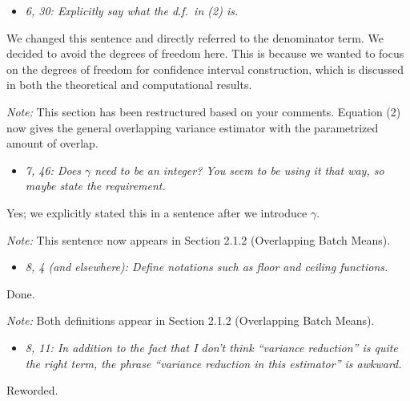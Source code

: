 \documentclass[11pt,notitlepage,onecolumn]{article}
\newcommand{\noi}{\noindent}
\begin{document}
\begin{itemize}
\item[] \textit{6, 30: Explicitly say what the d.f.\ in (2) is.}
\end{itemize}

\noi
We changed this sentence and directly referred to the denominator term.
We decided to avoid the degrees of freedom here. 
This is because we wanted to focus on the degrees of freedom for confidence interval construction, which is discussed in both the theoretical and computational results.\smallskip  

\noi 
{\it Note:} This section has been restructured based on your comments. 
Equation (2) now gives the general overlapping variance estimator with the parametrized amount of overlap. 
\medskip 



\begin{itemize}
\item[] \textit{7, 46: Does $\gamma$ need to be an integer? 
You seem to be using it that way, so maybe state the requirement.}
\end{itemize}

\noi
Yes; we explicitly stated this in a sentence after we introduce $\gamma$.\smallskip 

\noi 
{\it Note:} This sentence now appears in Section 2.1.2 (Overlapping Batch Means). 
\medskip 



\begin{itemize}
\item[] \textit{8, 4 (and elsewhere): Define notations such as floor and ceiling functions.}
\end{itemize}

\noi
Done. 
\smallskip  

\noi 
{\it Note:} Both definitions appear in Section 2.1.2 (Overlapping Batch Means).
\medskip 



\begin{itemize}
\item[] \textit{8, 11: In addition to the fact that I don't think ``variance reduction'' is quite the right term, the phrase ``variance reduction in this estimator'' is awkward.}
\end{itemize}

\noi
Reworded.\smallskip 
\end{document}

